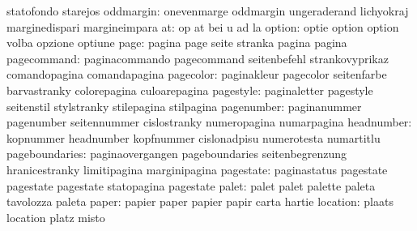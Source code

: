                            statofondo                starejos
                oddmargin: onevenmarge               oddmargin
                           ungeraderand              lichyokraj
                           marginedispari            margineimpara
                       at: op                        at
                           bei                       u
                           ad                        la
                   option: optie                     option
                           option                    volba
                           opzione                   optiune
                     page: pagina                    page
                           seite                     stranka
                           pagina                    pagina
              pagecommand: paginacommando            pagecommand
                           seitenbefehl              strankovyprikaz
                           comandopagina             comandapagina
                pagecolor: paginakleur               pagecolor
                           seitenfarbe               barvastranky
                           colorepagina              culoarepagina
                pagestyle: paginaletter              pagestyle
                           seitenstil                stylstranky
                           stilepagina               stilpagina
               pagenumber: paginanummer              pagenumber
                           seitennummer              cislostranky
                           numeropagina              numarpagina
               headnumber: kopnummer                 headnumber
                           kopfnummer                cislonadpisu
                           numerotesta               numartitlu
           pageboundaries: paginaovergangen          pageboundaries
                           seitenbegrenzung          hranicestranky
                           limitipagina              marginipagina
                pagestate: paginastatus              pagestate
                           pagestate                 pagestate
                           statopagina               pagestate %
                    palet: palet                     palet
                           palette                   paleta
                           tavolozza                 paleta
                    paper: papier                    paper
                           papier                    papir
                           carta                     hartie
                 location: plaats                    location
                           platz                     misto
